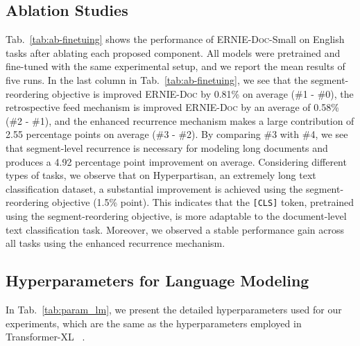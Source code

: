 \documentclass[11pt,a4paper]{article}
\newcommand{\mname}{\textsc{ERNIE-Doc}\xspace}
\begin{document}
\subsection{Ablation Studies}



Tab.~\ref{tab:ab-finetuing} shows the performance of \mname-Small on English tasks after ablating each proposed component. All models were pretrained and fine-tuned with the same experimental setup, and we report the mean results of five runs. In the last column in Tab.~\ref{tab:ab-finetuing}, we see that the segment-reordering objective is improved \mname by 0.81\% on average (\#1 - \#0), the retrospective feed mechanism is improved \mname by an average of 0.58\% (\#2 - \#1), and the enhanced recurrence mechanism makes a large contribution of 2.55 percentage points on average (\#3 - \#2). By comparing \#3 with \#4, we see that segment-level recurrence is necessary for modeling long documents and produces a 4.92 percentage point improvement on average. Considering different types of tasks, we observe that on Hyperpartisan, an extremely long text classification dataset, a substantial improvement is achieved using the segment-reordering objective (1.5\% point). This indicates that the \texttt{[CLS]} token, pretrained using the segment-reordering objective, is more adaptable to the document-level text classification task. Moreover, we observed a stable performance gain across all tasks using the enhanced recurrence mechanism.


\subsection{Hyperparameters for Language Modeling}
In Tab.~\ref{tab:param_lm}, we present the detailed hyperparameters used for our experiments, which are the same as the hyperparameters employed in Transformer-XL ~\citep{transformer_xl}.
\end{document}
